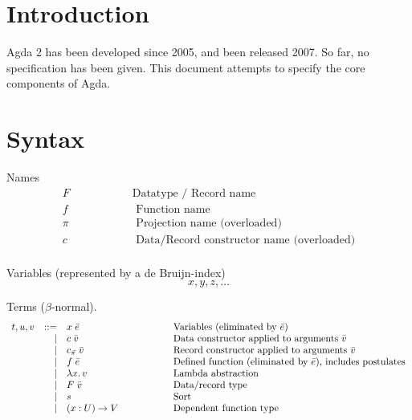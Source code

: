 \documentclass[acmlarge]{acmart}\settopmatter{}
\renewcommand{\|}{\mid}
\begin{document}
\section{Introduction}

Agda 2 has been developed since 2005, and been released 2007.  So far,
no specification has been given.  This document attempts to specify
the core components of Agda.


\section{Syntax}
\label{sec:syntax}

\newcommand{\bang}{\,!\,}
\newcommand{\twobang}{\,!!\,}


Names
\[
\begin{array}{ll}
  F & \hspace{2cm}\text{Datatype / Record name} \\
  f & \hspace{2cm}\text{   Function name} \\
\pi & \hspace{2cm}\text{  Projection name  (overloaded)} \\
  c & \hspace{2cm}\text{   Data/Record constructor name (overloaded)} \\
\end{array}
\]

Variables (represented by a de Bruijn-index)
\[
x,y,z, \hdots
\]

Terms ($\beta$-normal).
\[
\begin{array}{lrl@{\hspace{2cm}}l}
t, u, v &::=& x\; \bar{e}            & \text{Variables (eliminated by $\bar{e}$)} \\
          &|& c\; \bar{v}            & \text{Data constructor applied to arguments $\bar{v}$} \\
          &|& \cpi\; \bar{v}         & \text{Record constructor applied to arguments $\bar{v}$} \\
          &|& f\; \bar{e}            & \text{Defined function (eliminated by $\bar{e}$), includes postulates} \\
          &|& \lambda x.\, v         & \text{Lambda abstraction} \\
          &|& F\; \bar{v}            & \text{Data/record type} \\
          &|& s               & \text{Sort} \\
          &|& (x : U) \rightarrow V      & \text{Dependent function type} \\
\end{array}
\]
\end{document}
